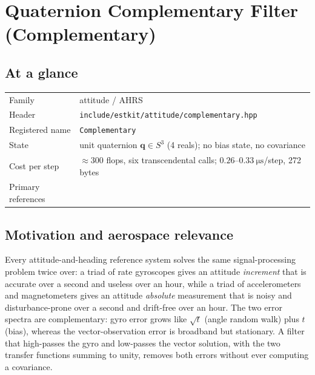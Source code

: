 \chapter{Quaternion Complementary Filter (Complementary)}
\label{ch:att-complementary}

\section*{At a glance}
\begin{tabular}{@{}l>{\raggedright\arraybackslash}p{}@{}}
Family & attitude / AHRS \\
Header & \texttt{include/estkit/attitude/complementary.hpp} \\
Registered name & \texttt{Complementary} \\
State & unit quaternion $\bm{q}\in S^3$ (4 reals); no bias state, no covariance \\
Cost per step & $\approx300$ flops, six transcendental calls;
  $0.26$--$\SI{0.33}{\micro\second}$/step, 272\,bytes \\
Primary references & \cite{higgins1975complementary,euston2008,titterton2004,markleycrassidis2014} \\
\end{tabular}

\section{Motivation and aerospace relevance}
Every attitude-and-heading reference system solves the same signal-processing problem twice over:
a triad of rate gyroscopes gives an attitude \emph{increment} that is accurate over a second and
useless over an hour, while a triad of accelerometers and magnetometers gives an attitude
\emph{absolute} measurement that is noisy and disturbance-prone over a second and drift-free over
an hour. The two error spectra are complementary: gyro error grows like $\sqrt{t}$ (angle random
walk) plus $t$ (bias), whereas the vector-observation error is broadband but stationary. A filter
that high-passes the gyro and low-passes the vector solution, with the two transfer functions
summing to unity, removes both errors without ever computing a covariance.

